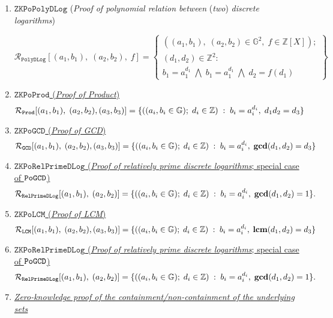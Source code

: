 \documentclass[11pt, lettersize, notitlepage, leqno, footskip=0.6cm]{article}
\newcommand{\bz}{\mathbb Z}
\newcommand{\ttt}{\texttt}
\newcommand{\mc}{\mathcal}
\newcommand{\mb}{\mathbb}
\newcommand{\mbf}{\mathbf}
\newcommand{\vs}{\vspace{-0.15cm}}
\newcommand{\LCM}{\mbf{lcm}}
\newcommand{\GCD}{\mbf{gcd}}
\numberwithin{equation}{section}
\begin{document}
{{{\begin{enumerate}[wide, labelwidth=!, labelindent=0pt]
 

\item $\ttt{ZKPoPolyDLog}$ (\textit{Proof of polynomial relation between} (\textit{two}) \textit{discrete logarithms})\vspace{-0.3cm}

\[
  \mc{R}_{{\ttt{PolyDLog}}}[(a_1, b_1),\;(a_2,b_2),\;f] = \left\{\begin{array}{l}
    ((a_1, b_1), \; (a_2,b_2)\in\mb{G}^2,\;f\in\bz[X]);\\
    (d_1, d_2)\in\mb{Z}^2: \\
    b_1 = a_1^{d_1}\; \bigwedge\; b_1 = a_1^{d_1}\; \bigwedge \;d_2 = f(d_1)
  \end{array}\right\}
\]

\item \hyperlink{GCD}{$\ttt{ZKPoProd}$ (\textit{Proof of Product})} \vspace{-0.15cm} $$\mc{R}_{{\ttt{Prod}}}[(a_1,b_1),\; (a_2,b_2),(a_3,b_3)] = \{((a_i, b_i\in\mb{G});\;d_i\in\bz)\;:\; b_i = a_i^{d_i},\;d_1d_2 = d_3  \} \vs $$


\item \hyperlink{GCD}{$\ttt{ZKPoGCD}$ (\textit{Proof of GCD})} \vspace{-0.15cm} $$\mc{R}_{{\ttt{GCD}}}[(a_1,b_1),\; (a_2,b_2),(a_3,b_3)] = \{((a_i, b_i\in\mb{G});\;d_i\in\bz)\;:\; b_i = a_i^{d_i},\;\GCD(d_1,d_2)=d_3  \} \vs $$


\item \hyperlink{RP}{$\ttt{ZKPoRelPrimeDLog}$ (\textit{Proof of relatively prime discrete logarithms}; special case of $\tt{PoGCD}$)} \vs $$ \mc{R}_{\ttt{RelPrimeDLog}}[(a_1,b_1),\;(a_2,b_2)] = \{((a_i, b_i\in\mb{G});\;d_i\in\bz)\;:\; b_i = a_i^{d_i},\;\GCD(d_1,d_2)=1 \} . \vs $$


\item \hyperlink{LCM}{$\ttt{ZKPoLCM}$ (\textit{Proof of LCM})} \vspace{-0.15cm} $$\mc{R}_{{\ttt{LCM}}}[(a_1,b_1),\; (a_2,b_2),(a_3,b_3)] = \{((a_i, b_i\in\mb{G});\;d_i\in\bz)\;:\; b_i = a_i^{d_i},\;\LCM(d_1,d_2)=d_3  \} \vs $$


\item \hyperlink{RP}{$\ttt{ZKPoRelPrimeDLog}$ (\textit{Proof of relatively prime discrete logarithms}; special case of $\tt{PoGCD}$)} \vs $$ \mc{R}_{\ttt{RelPrimeDLog}}[(a_1,b_1),\;(a_2,b_2)] = \{((a_i, b_i\in\mb{G});\;d_i\in\bz)\;:\; b_i = a_i^{d_i},\;\GCD(d_1,d_2)=1 \} . \vs $$


\item \hyperlink{Sets}{\textit{Zero-knowledge proof of the containment/non-containment of the underlying sets}}\vspace{-0.3cm}


\end{enumerate}}}}
\end{document}
